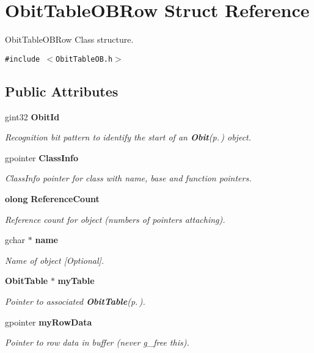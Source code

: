 \section{Obit\-Table\-OBRow Struct Reference}
\label{structObitTableOBRow}
Obit\-Table\-OBRow Class structure.  


{\tt \#include $<$Obit\-Table\-OB.h$>$}

\subsection*{Public Attributes}
\begin{CompactItemize}
\item 
gint32 {\bf Obit\-Id}
\begin{CompactList}\small\item\em Recognition bit pattern to identify the start of an {\bf Obit}{\rm (p.\,\pageref{structObit})} object. \item\end{CompactList}\item 
gpointer {\bf Class\-Info}
\begin{CompactList}\small\item\em Class\-Info pointer for class with name, base and function pointers. \item\end{CompactList}\item 
{\bf olong} {\bf Reference\-Count}
\begin{CompactList}\small\item\em Reference count for object (numbers of pointers attaching). \item\end{CompactList}\item 
gchar $\ast$ {\bf name}
\begin{CompactList}\small\item\em Name of object [Optional]. \item\end{CompactList}\item 
{\bf Obit\-Table} $\ast$ {\bf my\-Table}
\begin{CompactList}\small\item\em Pointer to associated {\bf Obit\-Table}{\rm (p.\,\pageref{structObitTable})}. \item\end{CompactList}\item 
gpointer {\bf my\-Row\-Data}
\begin{CompactList}\small\item\em Pointer to row data in buffer (never g\_\-free this). \item\end{CompactList}\item 

\end{CompactItemize}
